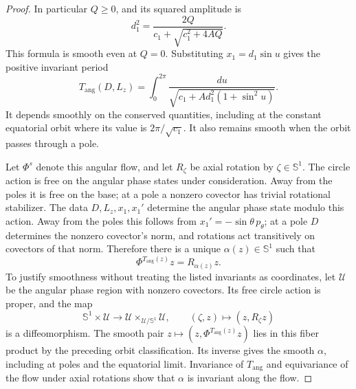 \begin{proof}
In particular $Q\geq0$, and its squared amplitude is
\begin{equation}
 d_1^2=\frac{2Q}{c_1+\sqrt{c_1^2+4AQ}}.
 \label{geo:amplitude}
\end{equation}
This formula is smooth even at $Q=0$.  Substituting
$x_1=d_1\sin u$ gives the positive invariant period
\begin{equation}
 T_{\mathrm{ang}}(D,L_z)
   =\int_0^{2\pi}
       \frac{du}{\sqrt{c_1+Ad_1^2(1+\sin^2u)}}.
 \label{geo:angular-period}
\end{equation}
It depends smoothly on the conserved quantities, including at the
constant equatorial orbit where its value is $2\pi/\sqrt{c_1}$.
It also remains smooth when the orbit passes through a pole.

Let $\Phi^s$ denote this angular flow, and let $R_\zeta$ be axial
rotation by $\zeta\in\mathbb S^1$.  The circle action is free on
the angular phase states under consideration.  Away from the poles
it is free on the base; at a pole a nonzero covector has trivial
rotational stabilizer.  The data $D,L_z,x_1,x_1'$ determine the
angular phase state modulo this action.  Away from the poles this
follows from $x_1'=-\sin\theta\,p_\theta$; at a pole $D$
determines the nonzero covector's norm, and rotations act transitively
on covectors of that norm.  Therefore there is a unique
$\alpha(z)\in\mathbb S^1$ such that
\begin{equation}
 \Phi^{T_{\mathrm{ang}}(z)}z=R_{\alpha(z)}z.
 \label{geo:angular-return}
\end{equation}
To justify smoothness without treating the listed invariants as
coordinates, let $\mathcal U$ be the angular phase region with
nonzero covectors.  Its free circle action is proper, and the map
\[
 \mathbb S^1\times\mathcal U\longrightarrow
       \mathcal U\times_{\mathcal U/\mathbb S^1}\mathcal U,
 \qquad (\zeta,z)\longmapsto(z,R_\zeta z)
\]
is a diffeomorphism.  The smooth pair
$z\mapsto(z,\Phi^{T_{\mathrm{ang}}(z)}z)$ lies in this fiber
product by the preceding orbit classification.  Its inverse gives
the smooth $\alpha$, including at poles and the equatorial limit.
Invariance of
$T_{\mathrm{ang}}$ and equivariance of the flow under axial rotations
show that $\alpha$ is invariant along the flow.


\end{proof}
